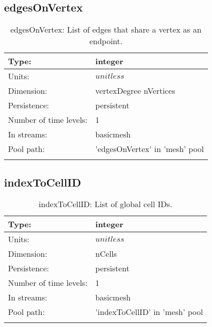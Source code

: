 \subsection[edgesOnVertex]{edgesOnVertex}
\label{subsec:var_sec_mesh_edgesOnVertex}
\begin{center}
\begin{longtable}{| p{2.0in} | p{4.0in} |}
        \hline 
        Type: & integer \\
        \hline 
        Units: & $unitless$ \\
        \hline 
        Dimension: & vertexDegree nVertices \\
        \hline 
        Persistence: & persistent \\
        \hline 
        Number of time levels: & 1 \\
        \hline 
		 In streams: &  basicmesh \\
        \hline 
            Pool path: & 'edgesOnVertex' in 'mesh' pool
 \\
		 \hline 
    \caption{edgesOnVertex: List of edges that share a vertex as an endpoint.}
\end{longtable}
\end{center}
\subsection[indexToCellID]{indexToCellID}
\label{subsec:var_sec_mesh_indexToCellID}
\begin{center}
\begin{longtable}{| p{2.0in} | p{4.0in} |}
        \hline 
        Type: & integer \\
        \hline 
        Units: & $unitless$ \\
        \hline 
        Dimension: & nCells \\
        \hline 
        Persistence: & persistent \\
        \hline 
        Number of time levels: & 1 \\
        \hline 
		 In streams: &  basicmesh \\
        \hline 
            Pool path: & 'indexToCellID' in 'mesh' pool
 \\
		 \hline 
    \caption{indexToCellID: List of global cell IDs.}
\end{longtable}
\end{center}
